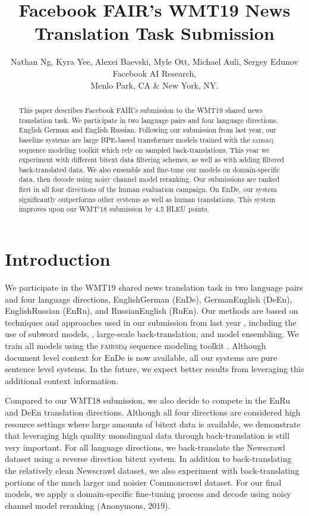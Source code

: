 \documentclass[11pt,a4paper]{article}
\title{Facebook FAIR's WMT19 News Translation Task Submission}
\author{Nathan Ng, Kyra Yee, Alexei Baevski, Myle Ott, Michael Auli, Sergey Edunov \\
Facebook AI Research, \\Menlo Park, CA \& New York, NY.}
\date{}
\newcommand{\fairseq}{\textsc{fairseq}}
\newcommand{\entode}{EnDe}
\newcommand{\detoen}{DeEn}
\newcommand{\entoru}{EnRu}
\newcommand{\rutoen}{RuEn}
\newcommand{\enbiru}{EnRu}
\begin{document}
\maketitle
\begin{abstract}
This paper describes Facebook FAIR's submission to the WMT19 shared news translation task.
We participate in two language pairs and four language directions, English  German and English  Russian.
Following our submission from last year, our baseline systems are large BPE-based transformer models trained with the \fairseq{} sequence modeling toolkit which rely on sampled back-translations.
This year we experiment with different bitext data filtering schemes, as well as with adding filtered back-translated data.
We also ensemble and fine-tune our models on domain-specific data, then decode using noisy channel model reranking.
Our submissions are ranked first in all four directions of the human evaluation campaign. 
On \entode{}, our system significantly outperforms other systems as well as human translations. 
This system improves upon our WMT'18 submission by 4.5 BLEU points. \end{abstract}

\section{Introduction}
We participate in the WMT19 shared news translation task in two language pairs and four language directions, EnglishGerman (\entode{}), GermanEnglish (\detoen{}), EnglishRussian (\entoru{}), and RussianEnglish (\rutoen{}). 
Our methods are based on techniques and approaches used in our submission from last year \cite{edunov2018understanding}, including the use of subword models, \cite{sennrich2016neural}, large-scale back-translation, and model ensembling.
We train all models using the \fairseq{} sequence modeling toolkit \cite{ott2019fairseq}. 
Although document level context for \entode{} is now available,  all our systems are pure sentence level systems.
In the future, we expect better results from leveraging this additional context information.

Compared to our WMT18 submission, we also decide to compete in the \enbiru{} and \detoen{} translation directions. 
Although all four directions are considered high resource settings where large amounts of bitext data is available, we demonstrate that leveraging high quality monolingual data through back-translation is still very important. 
For all language directions, we back-translate the Newscrawl dataset using a reverse direction bitext system.
In addition to back-translating the relatively clean Newscrawl dataset, we also experiment with back-translating portions of the much larger and noisier Commoncrawl dataset.
For our final models, we apply a domain-specific fine-tuning process and decode using noisy channel model reranking (Anonymous, 2019).
\end{document}
